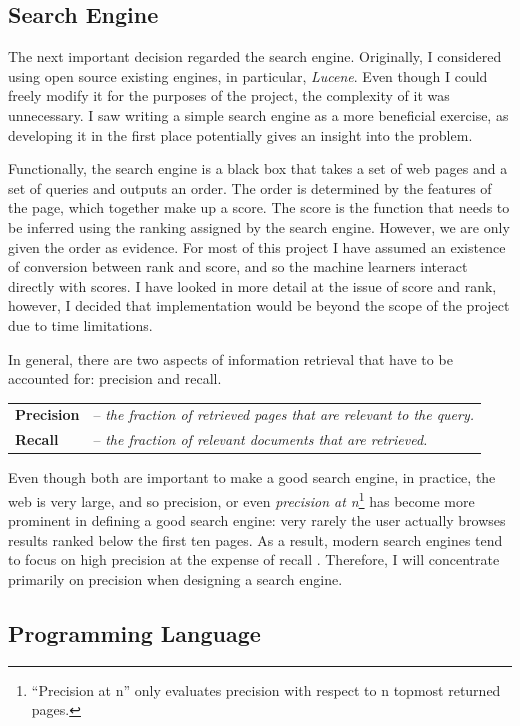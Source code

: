 \documentclass[12pt,notitlepage,twoside]{scrreprt}
\begin{document}
\subsection{Search Engine}
\label{prep:se}
The next important decision regarded the search engine.  Originally, I considered
using open source existing engines, in particular, \textit{Lucene}. Even though I could
freely modify it for the purposes of the project, the complexity of it was
unnecessary. I saw writing a simple search engine as a more beneficial
exercise, as developing it in the first place potentially gives an insight into
the problem.

Functionally, the search engine is a black box that takes a set of web pages and a set of
queries and outputs an order. The order is determined by the features of the page, which
together make up a score. The score is the function that needs to be inferred using the
ranking assigned by the search engine. However, we are only given the order as evidence.
For most of this project I have assumed an existence of conversion between rank and score,
and so the machine learners interact directly with scores. I have looked in more detail at
the issue of score and rank, however, I decided that implementation would be beyond the
scope of the project due to time limitations.

In general, there are two aspects of information retrieval that have to be accounted for:
precision and recall.  

\begin{tabular}{l l}
	\textbf{Precision} & -- \textit{the fraction of retrieved pages that are
relevant to the query.}  \\
\textbf{Recall} & -- \textit{the fraction of relevant documents that are
retrieved.} \\ 
\end{tabular}

Even though both are important to make a good search engine, in practice, the
web is very large, and so precision, or even \textit{precision at n}\footnote{``Precision
at n'' only evaluates precision with respect to n topmost returned pages.} has become more
prominent in defining a good search engine: very rarely the user actually browses results
ranked below the first ten pages. As a result, modern search engines tend
to focus on high precision at the expense of recall \cite{GOOGLE}. Therefore, I will
concentrate primarily on precision when designing a search engine.


\subsection{Programming Language}
\end{document}
